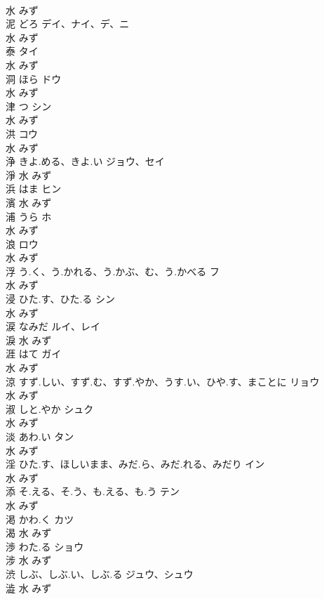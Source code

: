 \documentclass[8pt]{extreport}
\begin{document}
\begin{CJK}{UTF8}{min}
\\	水		みず		
\\	泥	どろ	デイ、ナイ、デ、ニ	
\\	水		みず		
\\	泰		タイ	
\\	水		みず		
\\	洞	ほら	ドウ	
\\	水		みず		
\\	津	つ	シン	
\\	水		みず		
\\	洪		コウ	
\\	水		みず		
\\	浄	きよ.める、きよ.い	ジョウ、セイ	
\\	淨	水		みず		
\\	浜	はま	ヒン	
\\	濱	水		みず		
\\	浦	うら	ホ	
\\	水		みず		
\\	浪		ロウ	
\\	水		みず		
\\	浮	う.く、う.かれる、う.かぶ、む、う.かべる	フ	
\\	水		みず		
\\	浸	ひた.す、ひた.る	シン	
\\	水		みず		
\\	涙	なみだ	ルイ、レイ	
\\	淚	水		みず		
\\	涯	はて	ガイ	
\\	水		みず		
\\	涼	すず.しい、すず.む、すず.やか、うす.い、ひや.す、まことに	リョウ	
\\	水		みず		
\\	淑	しと.やか	シュク	
\\	水		みず		
\\	淡	あわ.い	タン	
\\	水		みず		
\\	淫	ひた.す、ほしいまま、みだ.ら、みだ.れる、みだり	イン	
\\	水		みず		
\\	添	そ.える、そ.う、も.える、も.う	テン	
\\	水		みず		
\\	渇	かわ.く	カツ	
\\	渴	水		みず		
\\	渉	わた.る	ショウ	
\\	涉	水		みず		
\\	渋	しぶ、しぶ.い、しぶ.る	ジュウ、シュウ	
\\	澁	水		みず		

\end{CJK}
\end{document}
